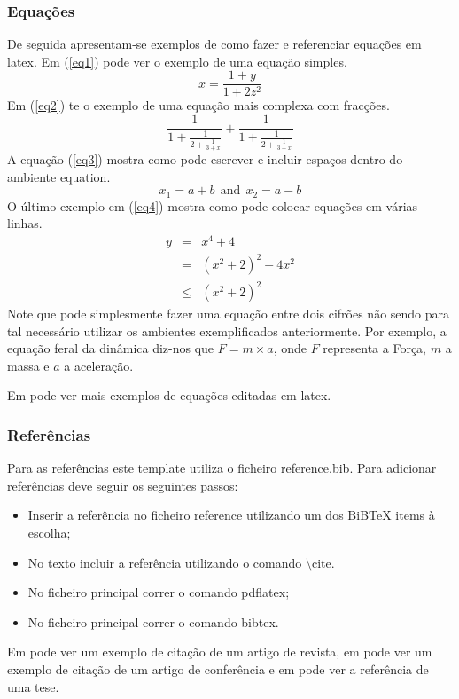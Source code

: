 \cleardoublepage 

\subsubsection{Equações}

De seguida apresentam-se exemplos de como fazer e referenciar equações em latex. Em (\ref{eq1}) pode ver o exemplo de uma equação simples.
\begin{equation}\label{eq1}
  x=\frac{1+y}{1+2z^2}
\end{equation}
Em (\ref{eq2}) te o exemplo de uma equação mais complexa com fracções.
\begin{equation}\label{eq2}
 \frac{1}{\displaystyle 1+
   \frac{1}{\displaystyle 2+
   \frac{1}{\displaystyle 3+x}}} +
 \frac{1}{1+\frac{1}{2+\frac{1}{3+x}}}
\end{equation}
A equação (\ref{eq3}) mostra como pode escrever e incluir espaços dentro do ambiente equation.
\begin{equation}\label{eq3}
  x_1 = a+b ~~\mbox{and}~~ x_2=a-b
\end{equation}
O último exemplo em (\ref{eq4}) mostra como pode colocar equações em várias linhas.
\begin{eqnarray}\label{eq4}
 y &=& x^4 + 4      \nonumber \\
   &=& (x^2+2)^2 -4x^2 \nonumber \\
   &\le&(x^2+2)^2
\end{eqnarray}
Note que pode simplesmente fazer uma equação entre dois cifrões não sendo para tal necessário utilizar os ambientes exemplificados anteriormente. Por exemplo, a equação feral da dinâmica diz-nos que $F=m\times a$, onde $F$ representa a Força, $m$ a massa e $a$ a aceleração.

Em \cite{CEU2017} pode ver mais exemplos de equações editadas em latex. 

\subsubsection{Referências}
Para as referências este template utiliza o ficheiro reference.bib. Para adicionar referências deve seguir os seguintes passos:
\begin{itemize}
  \item Inserir a referência no ficheiro reference utilizando um dos BiBTeX items à escolha;
  \item No texto incluir a referência utilizando o comando $\setminus$cite.
  \item No ficheiro principal correr o comando pdflatex;
  \item No ficheiro principal correr o comando bibtex.
\end{itemize}
Em \cite{Oliveira11wirelesssensor} pode ver um exemplo de citação de um artigo de revista, em \cite{Lopes2011} pode ver um exemplo de citação de um artigo de conferência e em \cite{Ferreira2015} pode ver a referência de uma tese. 

